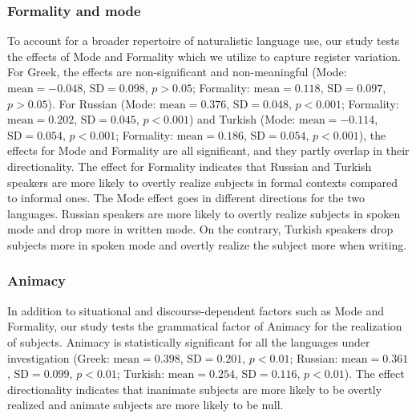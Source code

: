 \documentclass[output=paper,colorlinks,citecolor=brown]{langscibook}
\begin{document}
\subsubsection{Formality and mode} \label{sec:oezsoy:Registerandmodality}
To account for a broader repertoire of naturalistic language use, our study tests the effects of Mode and Formality which we utilize to capture register variation. For Greek, the effects are non-significant and non-meaningful (Mode: $\text{mean}=-0.048$, $\text{SD}=0.098$, $p>0.05$; Formality: $\text{mean}=0.118$, $\text{SD}=0.097$, $p>0.05$). For Russian (Mode: $\text{mean}=0.376$, $\text{SD}=0.048$, $p<0.001$; Formality: $\text{mean}=0.202$, $\text{SD}=0.045$, $p<0.001$) and Turkish (Mode: $\text{mean}=-0.114$, $\text{SD}=0.054$, $p<0.001$; Formality: $\text{mean}=0.186$, $\text{SD}=0.054$, $p<0.001$), the effects for Mode and Formality are all significant, and they partly overlap in their directionality. The effect for Formality indicates that Russian and Turkish speakers are more likely to overtly realize subjects in formal contexts compared to informal ones. The Mode effect goes in different directions for the two languages. Russian speakers are more likely to overtly realize subjects in spoken mode and drop more in written mode. On the contrary, Turkish speakers drop subjects more in spoken mode and overtly realize the subject more when writing.

\subsubsection{Animacy} \label{sec:oezsoy:Animacy}
In addition to situational and discourse-dependent factors such as Mode and Formality, our study tests the grammatical factor of Animacy for the realization of subjects. Animacy is statistically significant for all the languages under investigation (Greek: $\text{mean}=0.398$, $\text{SD}=0.201$, $p<0.01$; Russian: $\text{mean}=0.361$, $\text{SD}=0.099$, $p<0.01$; Turkish: $\text{mean}=0.254$, $\text{SD}=0.116$, $p<0.01$). The effect directionality indicates that inanimate subjects are more likely to be overtly realized and animate subjects are more likely to be null.


\end{document}
